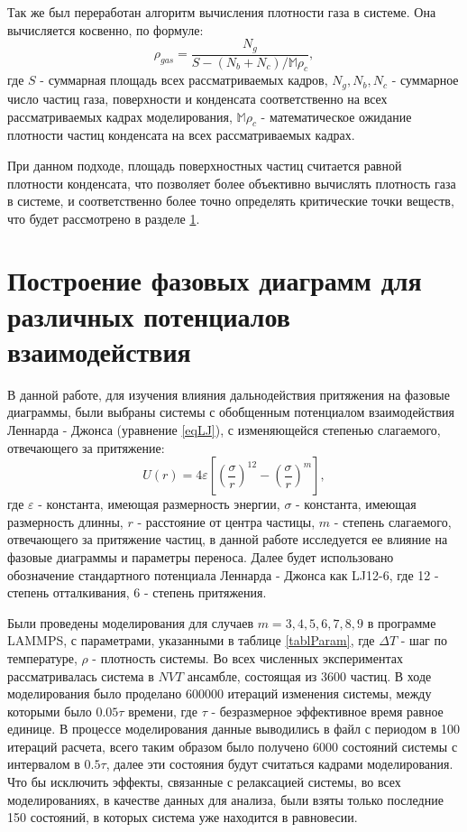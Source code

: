 Так же был переработан алгоритм вычисления плотности газа в системе. Она вычисляется косвенно, по формуле:
\begin{equation}
\rho_{gas} = \frac{N_{g}}{S - (N_{b} + N_{c}) / \mathbb{M}\rho_c},
\label{eqGas}
\end{equation}
где $S$ - суммарная площадь всех рассматриваемых кадров, $N_g, N_b, N_c$ - суммарное число частиц газа, поверхности и конденсата соответственно на всех рассматриваемых кадрах моделирования, $\mathbb{M}\rho_c$ - математическое ожидание плотности частиц конденсата на всех рассматриваемых кадрах.

При данном подходе, площадь поверхностных частиц считается равной плотности конденсата, что позволяет более объективно вычислять плотность газа в системе, и соответственно более точно определять критические точки веществ, что будет рассмотрено в разделе \ref{C2_2}.

\section{Построение фазовых диаграмм для различных потенциалов взаимодействия}\label{C2_2}

В данной работе, для изучения влияния дальнодействия притяжения на фазовые диаграммы, были выбраны системы с обобщенным потенциалом взаимодействия Леннарда - Джонса (уравнение \ref{eqLJ}), с изменяющейся степенью слагаемого, отвечающего за притяжение:
\begin{equation}
U(r) = 4\varepsilon \left[ \left(\frac{\sigma}{r}\right)^{12} - \left(\frac{\sigma}{r}\right)^{m} \right],
\label{eqLJ}
\end{equation}
где $\varepsilon$ - константа, имеющая размерность энергии, $\sigma$ - константа, имеющая размерность длинны, $r$ - расстояние от центра частицы, $m$ - степень слагаемого, отвечающего за притяжение частиц, в данной работе исследуется ее влияние на фазовые диаграммы и параметры переноса. Далее будет использовано обозначение стандартного потенциала Леннарда - Джонса как LJ12-6, где 12 - степень отталкивания, 6 - степень притяжения.

Были проведены моделирования для случаев $m = 3, 4, 5, 6, 7, 8, 9$ в программе LAMMPS, с параметрами, указанными в таблице \ref{tablParam}, где $\Delta T$ - шаг по температуре,  $\rho$ - плотность системы. Во всех численных экспериментах рассматривалась система в $NVT$ ансамбле, состоящая из 3600 частиц. В ходе моделирования было проделано 600000 итераций изменения системы, между которыми было $0.05\tau$ времени, где $\tau$ - безразмерное эффективное время равное единице. В процессе моделирования данные выводились в файл с периодом в 100 итераций расчета, всего таким образом было получено 6000 состояний системы с интервалом в $0.5\tau$, далее эти состояния будут считаться кадрами моделирования. Что бы исключить эффекты, связанные с релаксацией системы, во всех моделированиях, в качестве данных для анализа, были взяты только последние 150 состояний, в которых система уже находится в равновесии.

